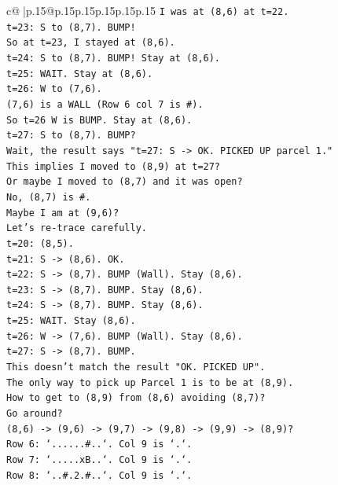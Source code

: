 \documentclass{article}
\begin{document}
{\begin{supertabular}{c@{$\;$}|p{.15\linewidth}@{}p{.15\linewidth}p{.15\linewidth}p{.15\linewidth}p{.15\linewidth}p{.15\linewidth}}
{{{\texttt{I was at (8,6) at t=22.} \\
\texttt{t=23: S to (8,7). BUMP!} \\
\texttt{So at t=23, I stayed at (8,6).} \\
\texttt{t=24: S to (8,7). BUMP! Stay at (8,6).} \\
\texttt{t=25: WAIT. Stay at (8,6).} \\
\texttt{t=26: W to (7,6).} \\
\texttt{(7,6) is a WALL (Row 6 col 7 is \#).} \\
\texttt{So t=26 W is BUMP. Stay at (8,6).} \\
\texttt{t=27: S to (8,7). BUMP?} \\
\texttt{Wait, the result says "t=27: S {-}> OK. PICKED UP parcel 1."} \\
\texttt{This implies I moved to (8,9) at t=27?} \\
\texttt{Or maybe I moved to (8,7) and it was open?} \\
\texttt{No, (8,7) is \#.} \\
\texttt{Maybe I am at (9,6)?} \\
\texttt{Let's re{-}trace carefully.} \\
\texttt{t=20: (8,5).} \\
\texttt{t=21: S {-}> (8,6). OK.} \\
\texttt{t=22: S {-}> (8,7). BUMP (Wall). Stay (8,6).} \\
\texttt{t=23: S {-}> (8,7). BUMP. Stay (8,6).} \\
\texttt{t=24: S {-}> (8,7). BUMP. Stay (8,6).} \\
\texttt{t=25: WAIT. Stay (8,6).} \\
\texttt{t=26: W {-}> (7,6). BUMP (Wall). Stay (8,6).} \\
\texttt{t=27: S {-}> (8,7). BUMP.} \\
\texttt{This doesn't match the result "OK. PICKED UP".} \\
\texttt{The only way to pick up Parcel 1 is to be at (8,9).} \\
\texttt{How to get to (8,9) from (8,6) avoiding (8,7)?} \\
\texttt{Go around?} \\
\texttt{(8,6) {-}> (9,6) {-}> (9,7) {-}> (9,8) {-}> (9,9) {-}> (8,9)?} \\
\texttt{Row 6: `......\#..`. Col 9 is `.`.} \\
\texttt{Row 7: `.....xB..`. Col 9 is `.`.} \\
\texttt{Row 8: `..\#.2.\#..`. Col 9 is `.`.} \\
}}}
\end{supertabular}}
\end{document}
